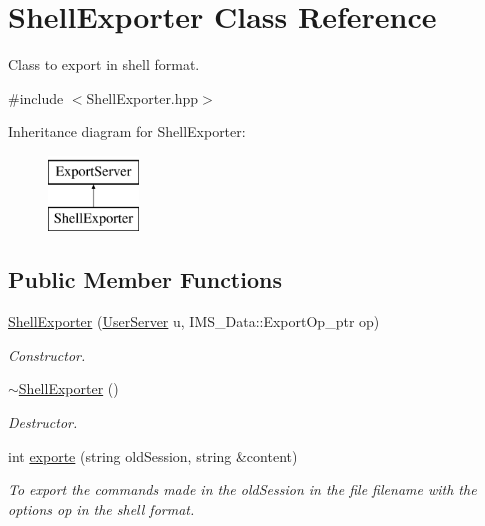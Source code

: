 \hypertarget{classShellExporter}{
\section{ShellExporter Class Reference}
\label{classShellExporter}
}


Class to export in shell format.  




{\ttfamily \#include $<$ShellExporter.hpp$>$}

Inheritance diagram for ShellExporter:\begin{figure}[H]
\begin{center}
\leavevmode
\includegraphics[height=2.000000cm]{classShellExporter}
\end{center}
\end{figure}
\subsection*{Public Member Functions}
\begin{DoxyCompactItemize}
\item 
\hyperlink{classShellExporter_af6bcdecb46d45faafecab41d663fed40}{ShellExporter} (\hyperlink{classUserServer}{UserServer} u, IMS\_\-Data::ExportOp\_\-ptr op)
\begin{DoxyCompactList}\small\item\em Constructor. \item\end{DoxyCompactList}\item 
\hypertarget{classShellExporter_a58a4b380430596c628774729b09f3f80}{
\hyperlink{classShellExporter_a58a4b380430596c628774729b09f3f80}{$\sim$ShellExporter} ()}
\label{classShellExporter_a58a4b380430596c628774729b09f3f80}

\begin{DoxyCompactList}\small\item\em Destructor. \item\end{DoxyCompactList}\item 
int \hyperlink{classShellExporter_a6170de97246f7e2ad1c7fb61d7850e90}{exporte} (string oldSession, string \&content)
\begin{DoxyCompactList}\small\item\em To export the commands made in the oldSession in the file filename with the options op in the shell format. \item\end{DoxyCompactList}\end{DoxyCompactItemize}
